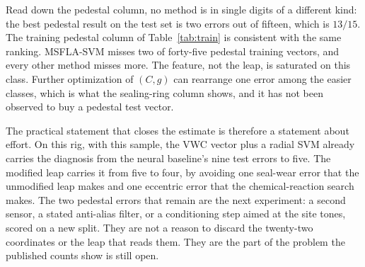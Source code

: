Read down the pedestal column, no method is in single digits of a different kind: the best pedestal result on the test set is two errors out of fifteen, which is \(13/15\).
The training pedestal column of Table~\ref{tab:train} is consistent with the same ranking.
MSFLA-SVM misses two of forty-five pedestal training vectors, and every other method misses more.
The feature, not the leap, is saturated on this class.
Further optimization of \((C, g)\) can rearrange one error among the easier classes, which is what the sealing-ring column shows, and it has not been observed to buy a pedestal test vector.

The practical statement that closes the estimate is therefore a statement about effort.
On this rig, with this sample, the VWC vector plus a radial SVM already carries the diagnosis from the neural baseline's nine test errors to five.
The modified leap carries it from five to four, by avoiding one seal-wear error that the unmodified leap makes and one eccentric error that the chemical-reaction search makes.
The two pedestal errors that remain are the next experiment: a second sensor, a stated anti-alias filter, or a conditioning step aimed at the site tones, scored on a new split.
They are not a reason to discard the twenty-two coordinates or the leap that reads them.
They are the part of the problem the published counts show is still open.
